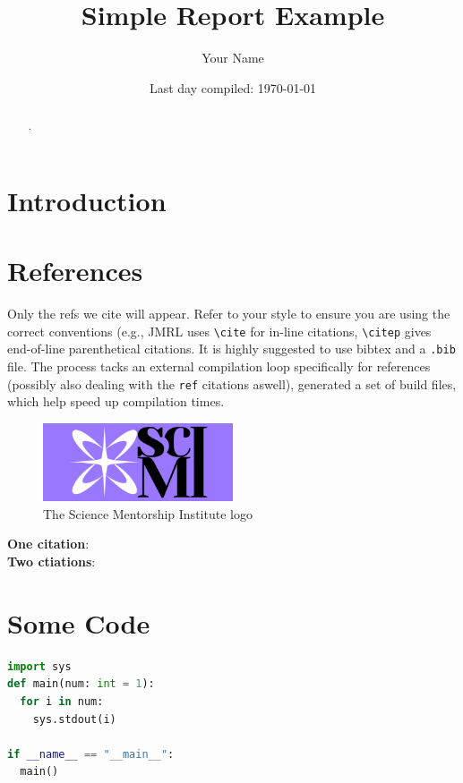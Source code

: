 \documentclass[letterpaper, 10pt]{article}
\title{Simple Report Example}
\author{Your Name}
\date{Last day compiled: \today}
\begin{document}
\maketitle
\tableofcontents

\begin{abstract}
  \lipsum[2]
.\end{abstract}

\section{Introduction}%
\label{sec:Introduction}



\section{References}%
\label{sec:References}
Only the refs we cite will appear. Refer to your style to ensure you are using
the correct conventions (e.g., JMRL uses \verb|\cite| for in-line citations,
\verb|\citep| gives end-of-line parenthetical citations. It is highly suggested
to use bibtex and a \verb|.bib| file. The process tacks an external compilation
loop specifically for references (possibly also dealing with the \verb|ref|
citations aswell), generated a set of build files, which help speed up
compilation times.

\begin{figure}[t]
  \centering
  \includegraphics[width=0.5\textwidth]{box_and_icon-purple}
  \caption{The Science Mentorship Institute logo}
  \label{fig:scimi}
\end{figure}

\noindent
\textbf{One citation}: \cite{texbook}\\
\textbf{Two ctiations}: \cite{latex:companion, latex2e}\\
\nocite{knuth:1984}

\printbibliography

\appendix
\section{Some Code}%
\label{sec:Some Code}

\begin{lstlisting}[language=Python]
import sys
def main(num: int = 1):
  for i in num:
    sys.stdout(i)
    
if __name__ == "__main__":
  main()
\end{lstlisting}
\end{document}
